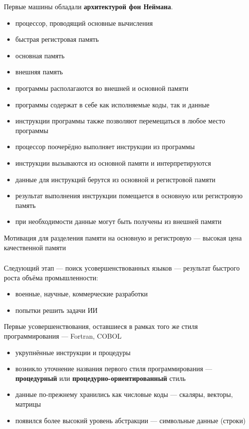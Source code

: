 Первые машины обладали \textbf{архитектурой фон Неймана}.
\begin{itemize}
  \item процессор, проводящий основные вычисления
  \item быстрая регистровая память
  \item основная память
  \item внешняя память
  \item программы располагаются во внешней и основной памяти
  \item программы содержат в себе как исполняемые коды, так и данные
  \item инструкции программы также позволяют перемещаться в любое место программы
  \item процессор поочерёдно выполняет инструкции из программы
  \item инструкции вызываются из основной памяти и интерпретируются
  \item данные для инструкций берутся из основной и регистровой памяти
  \item результат выполнения инструкции помещается в основную или регистровую память
  \item при необходимости данные могут быть получены из внешней памяти
\end{itemize}
Мотивация для разделения памяти на основную и регистровую ---  высокая цена качественной памяти

\subsubsection*{}
Следующий этап --- поиск усовершенствованных языков --- результат быстрого роста объёма промышленности:
\begin{itemize}
  \item военные, научные, коммерческие разработки
  \item попытки решить задачи ИИ
\end{itemize}

Первые усовершенствования, оставшиеся в рамках того же стиля программирования --- Fortran, COBOL
\begin{itemize}
  \item укрупнённые инструкции и процедуры
  \item возникло уточнение названия первого стиля программирования --- \textbf{процедурный} или \textbf{процедурно-ориентированный} стиль
  \item данные по-прежнему хранились как числовые коды --- скаляры, векторы, матрицы
  \item появился более высокий уровень абстракции --- символьные данные (строки)
\end{itemize}

